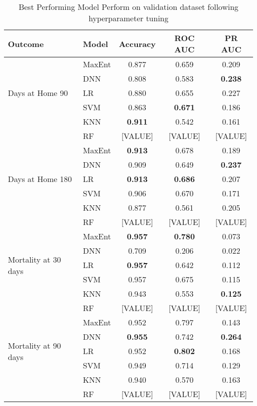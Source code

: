 \documentclass{article}
\begin{document}
    \begin{table}[htbp]
        \centering
        \caption{Best Performing Model Perform on validation dataset following hyperparameter tuning}
        \begin{tabular}{llccc}
        \hline
        Outcome & Model & Accuracy & ROC AUC & PR AUC \\
        \hline
        \multirow{5}{*}{Days at Home 90} & MaxEnt & 0.877 & 0.659 & 0.209 \\
        & DNN & 0.808 & 0.583 & \textbf{0.238} \\
        & LR & 0.880 & 0.655 & 0.227 \\
        & SVM & 0.863 & \textbf{0.671} & 0.186 \\
        & KNN & \textbf{0.911} & 0.542 & 0.161 \\
        & RF & [VALUE] & [VALUE] & [VALUE] \\
        \hline
        \multirow{5}{*}{Days at Home 180} & MaxEnt & \textbf{0.913} & 0.678 & 0.189 \\
        & DNN & 0.909 & 0.649 & \textbf{0.237} \\
        & LR & \textbf{0.913} & \textbf{0.686} & 0.207 \\
        & SVM & 0.906 & 0.670 & 0.171 \\
        & KNN & 0.877 & 0.561 & 0.205 \\
        & RF & [VALUE] & [VALUE] & [VALUE] \\
        \hline
        \multirow{5}{*}{Mortality at 30 days} & MaxEnt & \textbf{0.957} & \textbf{0.780} & 0.073 \\
        & DNN & 0.709 & 0.206 & 0.022 \\
        & LR & \textbf{0.957} & 0.642 & 0.112 \\
        & SVM & 0.957 & 0.675 & 0.115 \\
        & KNN & 0.943 & 0.553 & \textbf{0.125} \\
        & RF & [VALUE] & [VALUE] & [VALUE] \\
        \hline
        \multirow{5}{*}{Mortality at 90 days} & MaxEnt & 0.952 & 0.797 & 0.143 \\
        & DNN & \textbf{0.955} & 0.742 & \textbf{0.264} \\
        & LR & 0.952 & \textbf{0.802} & 0.168 \\
        & SVM & 0.949 & 0.714 & 0.129 \\
        & KNN & 0.940 & 0.570 & 0.163 \\
        & RF & [VALUE] & [VALUE] & [VALUE] \\

\end{tabular}
\end{table}
\end{document}
